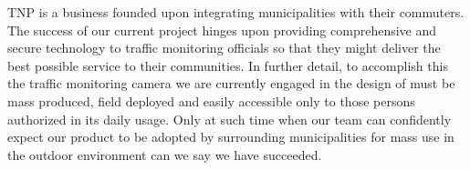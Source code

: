 TNP is a business founded upon integrating municipalities with their commuters. The success of our current project hinges upon providing comprehensive and secure technology to traffic monitoring officials so that they might deliver the best possible service to their communities. In further detail, to accomplish this the traffic monitoring camera we are currently engaged in the design of must be mass produced, field deployed and easily accessible only to those persons authorized in its daily usage. Only at such time when our team can confidently expect our product to be adopted by surrounding municipalities for mass use in the outdoor environment can we say we have succeeded.
